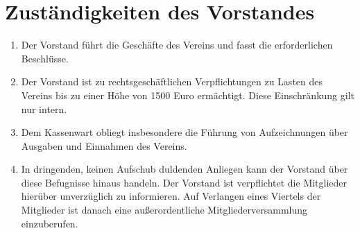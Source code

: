 \documentclass[ngerman]{article}
\begin{document}
\section{Zuständigkeiten des Vorstandes}
\begin{enumerate}
  \item Der Vorstand führt die Geschäfte des Vereins und fasst die erforderlichen Beschlüsse.
  \item Der Vorstand ist zu rechtsgeschäftlichen Verpflichtungen zu Lasten des Vereins bis zu einer Höhe von 1500 Euro ermächtigt. Diese Einschränkung gilt nur intern.
  \item Dem Kassenwart obliegt insbesondere die Führung von Aufzeichnungen über Ausgaben und Einnahmen des Vereins.
  \item In dringenden, keinen Aufschub duldenden Anliegen kann der Vorstand über diese Befugnisse hinaus handeln. Der Vorstand ist verpflichtet die Mitglieder hierüber unverzüglich zu informieren. Auf Verlangen eines Viertels der Mitglieder ist danach eine außerordentliche Mitgliederversammlung einzuberufen.
\end{enumerate}
\end{document}
